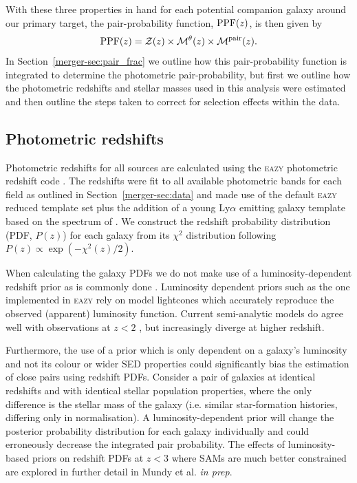 With these three properties in hand for each potential companion galaxy around our primary target, the pair-probability function, $\textup{PPF}(z)$, is then given by
\begin{equation}\label{eq:PPF}
\textup{PPF}(z) = \mathcal{Z}(z) \times \mathcal{M}^{\theta}(z) \times \mathcal{M}^{\text{pair}}(z).
\end{equation}
In Section~\ref{merger-sec:pair_frac} we outline how this pair-probability function is integrated to determine the photometric pair-probability, but first we outline how the photometric redshifts and stellar masses used in this analysis were estimated and then outline the steps taken to correct for selection effects within the data.

\subsection{Photometric redshifts}\label{merger-sec:photoz}
Photometric redshifts for all sources are calculated using the \textsc{eazy} photometric redshift code \citep{Brammer:2008gn}. The redshifts were fit to all available photometric bands for each field as outlined in Section~\ref{merger-sec:data} and made use of the default \textsc{eazy} reduced template set plus the addition of a young Ly$\alpha$ emitting galaxy template based on the spectrum of \citet{2010ApJ...719.1168E}. We construct the redshift probability distribution (PDF, $P(z)$) for each galaxy from its $\chi^{2}$ distribution following $P(z) \propto \exp(-\chi^{2}(z)/2)$.

When calculating the galaxy PDFs we do not make use of a luminosity-dependent redshift prior as is commonly done \citep{Brammer:2008gn,Dahlen:2013eu}. Luminosity dependent priors such as the one implemented in \textsc{eazy} rely on model lightcones which accurately reproduce the observed (apparent) luminosity function. Current semi-analytic models do agree well with observations at $z < 2$ \citep{Henriques:2012gsa}, but increasingly diverge at higher redshift.

Furthermore, the use of a prior which is only dependent on a galaxy's luminosity and not its colour or wider SED properties could significantly bias the estimation of close pairs using redshift PDFs. Consider a pair of galaxies at identical redshifts and with identical stellar population properties, where the only difference is the stellar mass of the galaxy (i.e. similar star-formation histories, differing only in normalisation). A luminosity-dependent prior will change the posterior probability distribution for each galaxy individually and could erroneously decrease the integrated pair probability. The effects of luminosity-based priors on redshift PDFs at $z < 3$ where SAMs are much better constrained are explored in further detail in Mundy et al. \emph{in prep}.

